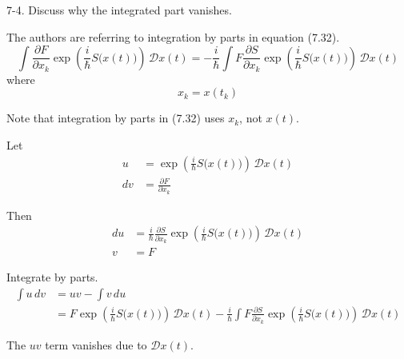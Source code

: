 \documentclass[12pt]{article}
\begin{document}
7-4.
Discuss why the integrated part vanishes.

\bigskip
The authors are referring to integration by parts in equation (7.32).
\begin{equation*}
\int\frac{\partial F}{\partial x_k}
\exp\left(\frac{i}{\hbar}S\big(x(t)\big)\right)\,\mathcal Dx(t)
=
-\frac{i}{\hbar}\int F\frac{\partial S}{\partial x_k}
\exp\left(\frac{i}{\hbar}S\big(x(t)\big)\right)\,\mathcal Dx(t)
\tag{7.32}
\end{equation*}
where
\begin{equation*}
x_k=x(t_k)
\end{equation*}

Note that integration by parts in (7.32) uses $x_k$, not $x(t)$.

\bigskip
Let
\begin{align*}
u&=\exp\left(\frac{i}{\hbar}S\big(x(t)\big)\right)\,\mathcal Dx(t)
\\
dv&=\frac{\partial F}{\partial x_k}
\end{align*}

Then
\begin{align*}
du&=\frac{i}{\hbar}
\frac{\partial S}{\partial x_k}
\exp\left(\frac{i}{\hbar}S\big(x(t)\big)\right)
\,\mathcal Dx(t)
\\
v&=F
\end{align*}

Integrate by parts.
\begin{align*}
\int u\,dv&=uv-\int v\,du
\\
&=F\exp\left(\frac{i}{\hbar}S\big(x(t)\big)\right)\,\mathcal Dx(t)
-\frac{i}{\hbar}\int F
\frac{\partial S}{\partial x_k}
\exp\left(\frac{i}{\hbar}S\big(x(t)\big)\right)
\,\mathcal Dx(t)
\end{align*}

The $uv$ term vanishes due to $\mathcal Dx(t)$.
\end{document}
